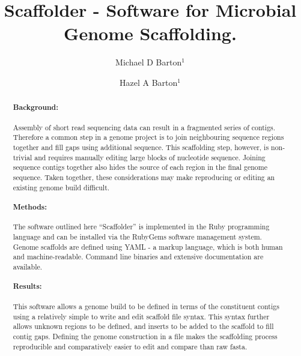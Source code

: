 \documentclass[10pt]{bmc_article}
\newenvironment{bmcformat}{\begin{raggedright}\baselineskip20pt\sloppy\setboolean{publ}{false}}{\end{raggedright}\baselineskip20pt\sloppy}
\begin{document}
\begin{bmcformat}

\title{Scaffolder - Software for Microbial Genome Scaffolding.} %

\author{
  Michael D Barton$^{1}$\correspondingauthor%
\and
  Hazel A Barton$^1$%
      }

\address{\iid(1) Department of Biological Sciences, Northern Kentucky %
University, Nunn Drive, Highland Heights, KY 41076 }%

\maketitle

\clearpage

\begin{abstract} %

  \paragraph*{Background:} Assembly of short read sequencing data can result
  in a fragmented series of contigs. Therefore a common step in a genome
  project is to join neighbouring sequence regions together and fill gaps
  using additional sequence. This scaffolding step, however, is non-trivial
  and requires manually editing large blocks of nucleotide sequence. Joining
  sequence contigs together also hides the source of each region in the final
  genome sequence. Taken together, these considerations may make reproducing
  or editing an existing genome build difficult.

  \paragraph*{Methods:} The software outlined here ``Scaffolder'' is
  implemented in the Ruby programming language and can be installed via the
  RubyGems software management system. Genome scaffolds are defined using
  YAML - a markup language, which is both human and machine-readable. Command
  line binaries and extensive documentation are available.

  \paragraph*{Results:} This software allows a genome build to be defined in
  terms of the constituent contigs using a relatively simple to write and edit
  scaffold file syntax. This syntax further allows  unknown regions to be
  defined, and inserts to be added to the scaffold to fill contig gaps.
  Defining the genome construction in a file makes the scaffolding process
  reproducible and comparatively easier to edit and compare than raw fasta.


\end{abstract}
\end{bmcformat}
\end{document}
